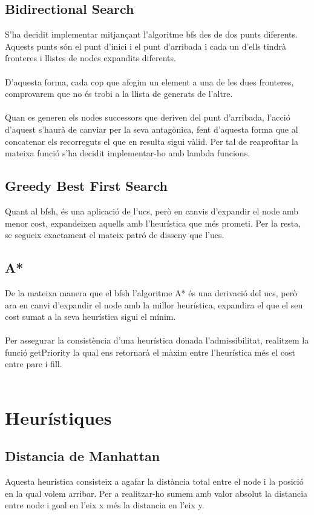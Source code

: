 \documentclass{article}
\begin{document}
\subsection{Bidirectional Search}
S'ha decidit implementar mitjançant l'algoritme bfs des de dos punts diferents. Aquests punts són el punt d'inici i el punt d'arribada i cada un d'ells tindrà fronteres i llistes de nodes expandits diferents.
\\\\
D'aquesta forma, cada cop que afegim un element a una de les dues fronteres, comprovarem que no és trobi a la llista de generats de l'altre.
\\\\
Quan es generen els nodes successors que deriven del punt d'arribada, l'acció d'aquest s'haurà de canviar per la seva antagònica, fent d'aquesta forma que al concatenar els recorreguts el que en resulta sigui vàlid. Per tal de reaprofitar la mateixa funció s'ha decidit implementar-ho amb lambda funcions.
\subsection{Greedy Best First Search}
Quant al bfsh, és una aplicació de l'ucs, però en canvis d'expandir el node amb menor cost, expandeixen aquells amb l'heurística que més prometi. Per la resta, se segueix exactament el mateix patró de disseny que l'ucs.
\subsection{A*}
De la mateixa manera que el bfsh l'algoritme A* és una derivació del ucs, però ara en canvi d'expandir el node amb la millor heurística, expandira el que el seu cost sumat a la seva heurística sigui el mínim.
\\\\
Per assegurar la consistència d'una heurística donada l'admissibilitat, realitzem la funció getPriority la qual ens retornarà el màxim entre l'heurística més el cost entre pare i fill.
\\\\
\section{Heurístiques}
\subsection{Distancia de Manhattan}
Aquesta heurística consisteix a agafar la distància total entre el node i la posició en la qual volem arribar. Per a realitzar-ho sumem amb valor absolut la distancia entre node i goal en l'eix x més la distancia en l'eix y.
\end{document}

